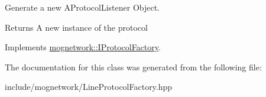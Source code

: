 Generate a new A\-Protocol\-Listener Object. 

\begin{DoxyReturn}{Returns}
A new instance of the protocol 
\end{DoxyReturn}


Implements \hyperlink{classmognetwork_1_1_i_protocol_factory_a9ed1ba40ab28b76a1285985b1d3662d6}{mognetwork\-::\-I\-Protocol\-Factory}.



The documentation for this class was generated from the following file\-:\begin{DoxyCompactItemize}
\item 
include/mognetwork/Line\-Protocol\-Factory.\-hpp\end{DoxyCompactItemize}

